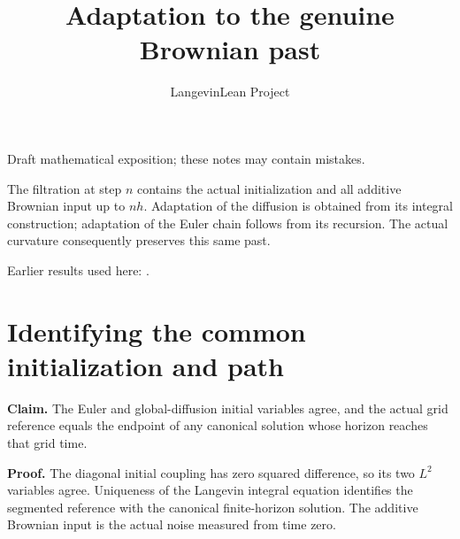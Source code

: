\documentclass[11pt,a4paper]{article}
\title{\texorpdfstring{Adaptation to the genuine Brownian past}{Adaptation to the genuine Brownian past}}
\author{LangevinLean Project}
\date{}
\begin{document}
\maketitle
Draft mathematical exposition; these notes may contain mistakes.


The filtration at step \(n\) contains the actual initialization and all additive Brownian input up to \(nh\). Adaptation of the diffusion is obtained from its integral construction; adaptation of the Euler chain follows from its recursion. The actual curvature consequently preserves this same past.



Earlier results used here: \cite[Section~3.54]{LangevinLean2026ULASC}.

\section{\texorpdfstring{Identifying the common initialization and path}{Identifying the common initialization and path}}


\textbf{Claim.} The Euler and global-diffusion initial variables agree, and the actual grid reference equals the endpoint of any canonical solution whose horizon reaches that grid time.



\textbf{Proof.} The diagonal initial coupling has zero squared difference, so its two \(L^2\) variables agree. Uniqueness of the Langevin integral equation identifies the segmented reference with the canonical finite-horizon solution. The additive Brownian input is the actual noise measured from time zero.
\end{document}
